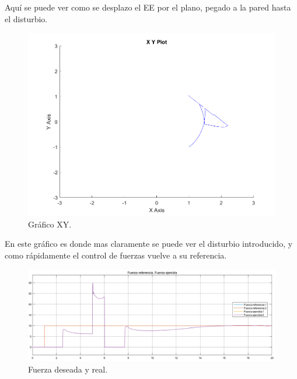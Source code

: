 Aquí se puede ver como se desplazo el EE por el plano, pegado a la pared hasta el disturbio.
\begin{figure}[H]
	\centering
	\includegraphics[width=0.5\linewidth]{ImagenesControl híbrido no lineal/3_3_f_c}
	\caption{Gr\'afico XY.}	
	\label{fig:cxyd}
\end{figure}
En este gráfico es donde mas claramente se puede ver el disturbio introducido, y como rápidamente el control de fuerzas vuelve a su referencia.
\begin{figure}[H]
	\centering
	\includegraphics[width=0.8\linewidth]{ImagenesControl híbrido no lineal/3_3_f_e}
	\caption{Fuerza deseada y real.}	
	\label{fig:cfd}
\end{figure}
%